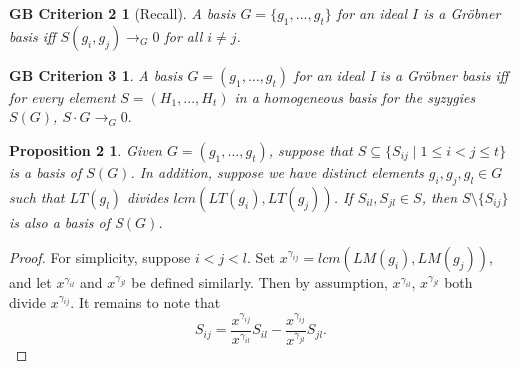 \documentclass{beamer}
\newtheorem{prop}{Proposition}
\newtheorem{prop2}{Proposition 2}
\newtheorem{gbc2}{GB Criterion 2}
\newtheorem{gbc3}{GB Criterion 3}
\newtheorem{thm}{Theorem}
\begin{document}

\begin{frame}
\begin{footnotesize}
\begin{gbc2}[Recall]
A basis $G = \{g_1, ..., g_t\}$ for an ideal $I$ is a Gr{\"o}bner basis iff $S(g_i,g_j)\rightarrow_G 0$ for all $i\neq j$.
\end{gbc2}
\pause
\begin{gbc3}
A basis $G = (g_1, ..., g_t)$ for an ideal I is a Gr{\"o}bner basis iff for every element $S = (H_1,...,H_t)$ in a homogeneous basis for the syzygies $S(G)$, $S\cdot G \rightarrow_G 0.$ 
\end{gbc3}
\pause
\begin{prop2}
Given $G = (g_1,...,g_t)$, suppose that $S\subseteq \{S_{ij}\mid 1\leq i<j\leq t\}$ is a basis of $S(G)$. In addition, suppose we have distinct elements $g_i, g_j, g_l\in G$ such that $LT(g_l)$ divides $lcm(LT(g_i),LT(g_j))$. If $S_{il}, S_{jl}\in S$, then $S\setminus \{S_{ij}\}$ is also a basis of S$(G)$. 
\end{prop2}
\pause
\begin{proof}
For simplicity, suppose $i<j<l$. Set $x^{\gamma_{ij}} = lcm(LM(g_i),LM(g_j))$, and let $x^{\gamma_{il}}$ and $x^{\gamma_{jl}}$ be defined similarly. Then by assumption, $x^{\gamma_{il}}$, $x^{\gamma_{jl}}$ both divide $x^{\gamma_{ij}}$. It remains to note that $$ S_{ij} = \frac{x^{\gamma_{ij}}}{x^{\gamma_{il}}}S_{il} - \frac{x^{\gamma_{ij}}}{x^{\gamma_{jl}}}S_{jl}.$$
\end{proof}
\end{footnotesize}
\end{frame}


\end{document}
